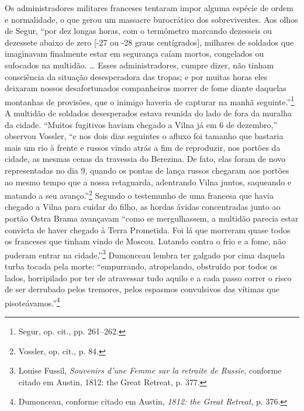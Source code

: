 Os administradores militares franceses tentaram impor alguma espécie de
ordem e normalidade, o que gerou um massacre burocrático dos
sobreviventes. Aos olhos de Segur, ``por dez longas horas, com o
termômetro marcando dezesseis ou dezessete abaixo de zero {[}-27 ou -28
graus centígrados{]}, milhares de soldados que imaginavam finalmente
estar em segurança caíam mortos, congelados ou sufocados na multidão.
\ldots{} Esses administradores, cumpre dizer, não tinham consciência da
situação desesperadora das tropas; e por muitas horas eles deixaram
nossos desafortunados companheiros morrer de fome diante daquelas
montanhas de provisões, que o inimigo haveria de capturar na manhã
seguinte.''\footnote{Segur, op. cit., pp. 261--262.} A multidão de
soldados desesperados estava reunida do lado de fora da muralha da
cidade. ``Muitos fugitivos haviam chegado a Vilna já em 6 de dezembro,''
observou Vossler, ``e nos dois dias seguintes o afluxo foi tamanho que
bastaria mais um rio à frente e russos vindo atrás a fim de reproduzir,
nos portões da cidade, as mesmas cenas da travessia do Berezina. De
fato, elas foram de novo representadas no dia 9, quando os pontas de
lança russos chegaram aos portões ao mesmo tempo que a nossa retaguarda,
adentrando Vilna juntos, saqueando e matando a seu avanço.''\footnote{Vossler, op. cit., p. 84.} Segundo o testemunho de uma francesa que havia chegado a Vilna para cuidar do filho, as hordas ávidas concentradas
junto ao portão Ostra Brama avançavam ``como se mergulhassem, a multidão
parecia estar convicta de haver chegado à Terra Prometida. Foi lá que
morreram quase todos os franceses que tinham vindo de Moscou. Lutando
contra o frio e a fome, não puderam entrar na cidade.''\footnote{Louise Fussil, \textit{Souvenirs d'une Femme sur la retraite de Russie}, conforme citado em Austin, 1812: the Great Retreat, p. 377.} Dumonceau lembra ter galgado por cima daquela turba tocada pela morte:
``empurrando, atropelando, obstruído por todos os lados, horripilado por
ter de atravessar tudo aquilo e a cada passo correr o risco de ser
derrubado pelos tremores, pelos espasmos convulsivos das vítimas que
pisoteávamos.''\footnote{Dumonceau, conforme citado em Austin, \textit{1812: the Great Retreat}, p. 376.}

